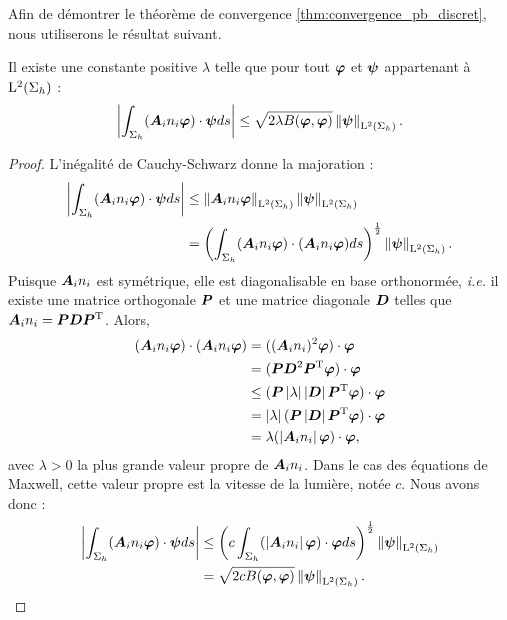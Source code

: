 Afin de démontrer le théorème de convergence  \ref{thm:convergence_pb_discret},
nous utiliserons le résultat suivant.
\begin{lemma} \label{lem:maj_forme_bilin}
	Il existe une constante positive $\lambda$ telle que pour tout
	$\bm{\varphi}$ et $\bm{\psi}$ appartenant à $\mathrm{L}^2(\Sigma_h)$ :
	\begin{align}
		\left\vert\int_{\Sigma_h} ({\bm{A}_{i}n_{i}} \bm{\varphi}) \cdot \bm{\psi} ds\right\vert
		\le \sqrt{2 \lambda B(\bm{\varphi},\bm{\varphi})} \left\Vert\bm{\psi}\right\Vert_{\mathrm{L}^2(\Sigma_h)} .
	\end{align}
\end{lemma}
\begin{proof}
	L’inégalité de Cauchy-Schwarz donne la majoration :
	\begin{equation}
		\begin{aligned}
			\left\vert\int_{\Sigma_h} ({\bm{A}_{i}n_{i}} \bm{\varphi}) \cdot \bm{\psi} ds\right\vert
			&\le \left\Vert{\bm{A}_{i}n_{i}} \bm{\varphi}\right\Vert_{\mathrm{L}^2(\Sigma_h)}
				\left\Vert\bm{\psi}\right\Vert_{\mathrm{L}^2(\Sigma_h)} \\
			&= \left(
				\int_{\Sigma_h} ({\bm{A}_{i}n_{i}} \bm{\varphi}) \cdot ({\bm{A}_{i}n_{i}} \bm{\varphi}) ds
				\right)^\frac{1}{2} \left\Vert\bm{\psi}\right\Vert_{\mathrm{L}^2(\Sigma_h)} .
		\end{aligned}
	\end{equation}
	Puisque ${\bm{A}_{i}n_{i}}$ est symétrique, elle est diagonalisable en base
	orthonormée, \textit{i.e.} il existe une matrice orthogonale $\bm{P}$
	et une matrice diagonale $\bm{D}$ telles que ${\bm{A}_{i}n_{i}} = \bm{P} \bm{D} \bm{P}^{\mathrm{T}}$.
	Alors,
	\begin{equation}
		\begin{aligned}
			({\bm{A}_{i}n_{i}} \bm{\varphi}) \cdot ({\bm{A}_{i}n_{i}} \bm{\varphi})
			&= (({\bm{A}_{i}n_{i}})^2 \bm{\varphi}) \cdot \bm{\varphi} \\
			&= (\bm{P} \bm{D}^2 \bm{P}^{\mathrm{T}} \bm{\varphi}) \cdot \bm{\varphi} \\
			&\le (\bm{P} \left\vert\lambda\right\vert \left\vert\bm{D}\right\vert \bm{P}^{\mathrm{T}} \bm{\varphi}) \cdot \bm{\varphi} \\
			&= \left\vert\lambda\right\vert (\bm{P} \left\vert\bm{D}\right\vert \bm{P}^{\mathrm{T}} \bm{\varphi}) \cdot \bm{\varphi} \\
			&= \lambda (\left\vert{\bm{A}_{i}n_{i}}\right\vert \bm{\varphi}) \cdot \bm{\varphi} ,
		\end{aligned}
	\end{equation}
	avec $\lambda > 0$ la plus grande valeur propre de ${\bm{A}_{i}n_{i}}$.
	Dans le cas des équations de Maxwell, cette valeur propre est la vitesse
	de la lumière, notée $c$.
	Nous avons donc :
	\begin{equation}
		\begin{aligned}
			\left\vert\int_{\Sigma_h} ({\bm{A}_{i}n_{i}} \bm{\varphi}) \cdot \bm{\psi} ds\right\vert
			&\le \left( c \int_{\Sigma_h}
				(\left\vert{\bm{A}_{i}n_{i}}\right\vert \bm{\varphi}) \cdot \bm{\varphi} ds
				\right)^\frac{1}{2} \left\Vert\bm{\psi}\right\Vert_{\mathrm{L}^2(\Sigma_h)} \\
			&= \sqrt{2 c B(\bm{\varphi},\bm{\varphi})} \left\Vert\bm{\psi}\right\Vert_{\mathrm{L}^2(\Sigma_h)}.
		\end{aligned}
	\end{equation}
\end{proof}

